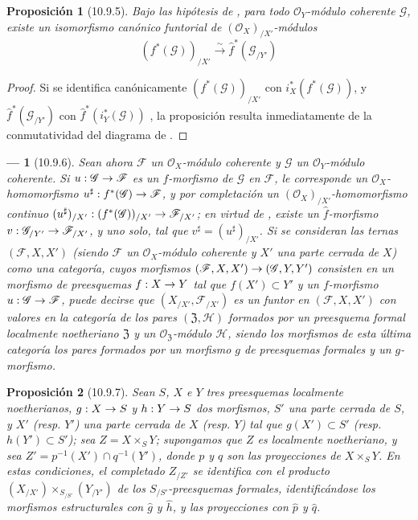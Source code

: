 \documentclass[oneside]{amsart}
\theoremstyle{ega-env-style}
\newtheorem*{env}{---}
\theoremstyle{ega-thm-env-style}
\newtheorem*{proposition}{Proposición}
\theoremstyle{ega-defn-env-style}
\renewcommand{\to}{\mathchoice{\longrightarrow}{\rightarrow}{\rightarrow}{\rightarrow}}
\newcommand{\oldpage}[2][]{{\marginnote{\normalfont{\textbf{#1}~|~#2}}}\ignorespaces}
\let\EGAOriginalLabel\label
\renewcommand{\label}[1]{\phantomsection\EGAOriginalLabel{#1}}
\begin{document}
\begin{proposition}[10.9.5]
\label{I.10.9.5}
Bajo las hipótesis de , para todo $\mathscr{O}_Y$-módulo coherente $\mathscr{G}$, existe un isomorfismo canónico funtorial de $(\mathscr{O}_X)_{/X'}$-módulos
\[
  (f^*(\mathscr{G}))_{/X'}\xrightarrow{\sim}
  \widehat f^*(\mathscr{G}_{/Y'})
\]
\end{proposition}

\begin{proof}
Si se identifica canónicamente $(f^*(\mathscr{G}))_{/X'}$ con $i_X^*(f^*(\mathscr{G}))$, y $\widehat f^*(\mathscr{G}_{/Y'})$ con $\widehat f^*(i_Y^*(\mathscr{G}))$ , la proposición resulta inmediatamente de la conmutatividad del diagrama de .
\end{proof}

\begin{env}[10.9.6]
\label{I.10.9.6}
Sean ahora $\mathscr{F}$ un $\mathscr{O}_X$-módulo coherente y $\mathscr{G}$ un $\mathscr{O}_Y$-módulo coherente.
Si $u:\mathscr{G}\to\mathscr{F}$ es un $f$-morfismo de $\mathscr{G}$ en $\mathscr{F}$, le corresponde un $\mathscr{O}_X$-homomorfismo $u^\sharp:f^*(\mathscr{G})\to\mathscr{F}$, y por completación un $(\mathscr{O}_X)_{/X'}$-homomorfismo continuo $(u^\sharp)_{/X'}:(f^*(\mathscr{G}))_{/X'}\to\mathscr{F}_{/X'}$; en virtud de , existe un $\widehat f$-morfismo $v:\mathscr{G}_{/Y'}\to\mathscr{F}_{/X'}$,
\oldpage[I]{200}
y uno solo, tal que $v^\sharp=(u^\sharp)_{/X'}$.
Si se consideran las ternas $(\mathscr{F},X,X')$ (siendo $\mathscr{F}$ un $\mathscr{O}_X$-módulo coherente y $X'$ una parte cerrada de $X$) como una \emph{categoría}, cuyos morfismos $(\mathscr{F},X,X')\to(\mathscr{G},Y,Y')$ consisten en un morfismo de preesquemas $f:X\to Y$ tal que $f(X')\subset Y'$ y un $f$-morfismo $u:\mathscr{G}\to\mathscr{F}$, puede decirse que $(X_{/X'},\mathscr{F}_{/X'})$ es un \emph{funtor} en $(\mathscr{F},X,X')$ con valores en la categoría de los pares $(\mathfrak{Z},\mathscr{H})$ formados por un preesquema formal localmente noetheriano $\mathfrak{Z}$ y un $\mathscr{O}_{\mathfrak{Z}}$-módulo $\mathscr{H}$, siendo los morfismos de esta última categoría los pares formados por un morfismo $g$ de preesquemas formales y un $g$-morfismo.
\end{env}

\begin{proposition}[10.9.7]
\label{I.10.9.7}
Sean $S$, $X$ e $Y$ tres preesquemas localmente noetherianos, $g:X\to S$ y $h:Y\to S$ dos morfismos, $S'$ una parte cerrada de $S$, y $X'$ \textup{(resp. $Y'$)} una parte cerrada de $X$ \textup{(resp. $Y$)} tal que $g(X')\subset S'$ \textup{(resp. $h(Y')\subset S'$)}; sea $Z=X\times_S Y$; supongamos que $Z$ es localmente noetheriano, y sea $Z'=p^{-1}(X')\cap q^{-1}(Y')$, donde $p$ y $q$ son las proyecciones de $X\times_S Y$.
En estas condiciones, el completado $Z_{/Z'}$ se identifica con el producto $(X_{/X'})\times_{S_{/S'}}(Y_{/Y'})$ de los $S_{/S'}$-preesquemas formales, identificándose los morfismos estructurales con $\widehat g$ y $\widehat h$, y las proyecciones con $\widehat p$ y $\widehat q$.
\end{proposition}
\end{document}

